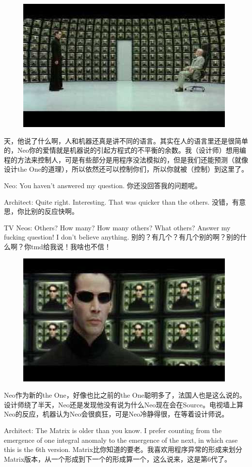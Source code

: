 \documentclass{ctexart}
\begin{document}
\begin{figure}[htb]
\centering
\includegraphics[width=0.5\linewidth]{fig/read_reloaded-159}
\end{figure}

天，他说了什么啊，人和机器还真是讲不同的语言。其实在人的语言里还是很简单的，Neo你的爱情就是机器说的引起方程式的不平衡的余数。我（设计师）想用编程的方法来控制人，可是有些部分是用程序没法模拟的，但是我们还能预测（就像设计the One的道理），所以依然还可以控制你们，所以你就被（控制）到这里了。

Neo: You haven’t answered my question. 你还没回答我的问题呢。

Architect: Quite right. Interesting. That was quicker than the others. 没错，有意思，你比别的反应快啊。

TV Neos: Others? How many? How many others? What others? Answer my fucking question! I don’t believe anything. 别的？有几个？有几个别的啊？别的什么啊？你tmd给我说！我啥也不信！

\begin{figure}[htb]
\centering
\includegraphics[width=0.5\linewidth]{fig/read_reloaded-160}
\end{figure}

Neo作为新的the One，好像也比之前的the One聪明多了，法国人也是这么说的。设计师绕了半天，Neo还是发现他没有说为什么Neo现在会在Source。电视墙上算Neo的反应，机器认为Neo会很疯狂，可是Neo冷静得很，在等着设计师说。

Architect: The Matrix is older than you know. I prefer counting from the emergence of one integral anomaly to the emergence of the next, in which case this is the 6th version. Matrix比你知道的要老。我喜欢用程序异常的形成来划分Matrix版本，从一个形成到下一个的形成算一个，这么说来，这是第6代了。
\end{document}
